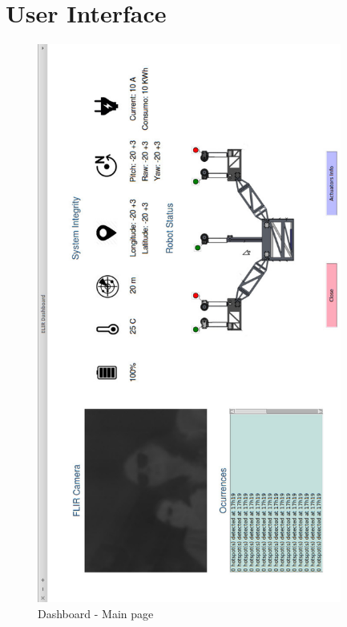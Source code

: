 
\chapter{User Interface}
\label{Append:wireframes}

	\begin{figure}[!ht]
	\centering
	\includegraphics[width=10cm]{Figures/userinterface.jpeg}
	\caption{Dashboard - Main page} \label{UI}
	\end{figure}

